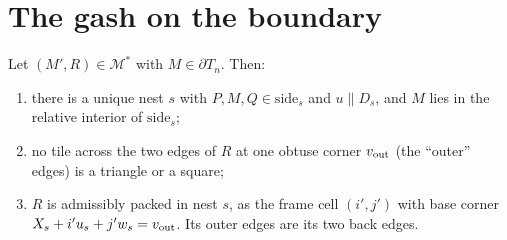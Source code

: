 \documentclass[11pt]{article}
\theoremstyle{definition}\newtheorem{definition}[theorem]{Definition}\newtheorem{remark}[theorem]{Remark}
\newcommand{\M}{\mathcal M}
\begin{document}
\section{The gash on the boundary}\label{sec:pack}
\begin{lemma}\label{lem:pack}
Let $(M',R)\in\M^*$ with $M\in\partial T_n$. Then:
\begin{enumerate}
\item there is a unique nest $s$ with $P,M,Q\in\mathrm{side}_s$ and $u\parallel D_s$, and $M$ lies in the relative interior of $\mathrm{side}_s$;
\item no tile across the two edges of $R$ at one obtuse corner $v_{\rm out}$ (the ``outer'' edges) is a triangle or a square;
\item $R$ is admissibly packed in nest $s$, as the frame cell $(i',j')$ with base corner $X_s+i'u_s+j'w_s=v_{\rm out}$. Its outer edges are its two back edges.
\end{enumerate}
\end{lemma}
\end{document}

